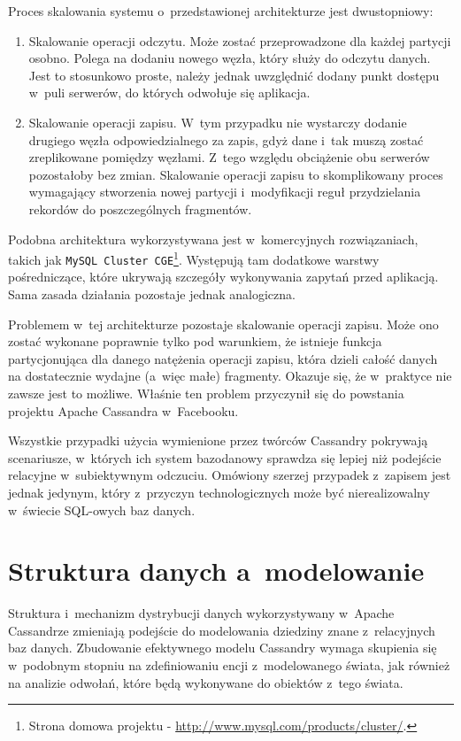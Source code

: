 Proces skalowania systemu o~przedstawionej architekturze jest dwustopniowy:

\begin{enumerate}
	\item Skalowanie operacji odczytu. Może zostać przeprowadzone dla każdej partycji osobno. Polega na dodaniu nowego węzła, który służy do odczytu danych. Jest to stosunkowo proste, należy jednak uwzględnić dodany punkt dostępu w~puli serwerów, do których odwołuje się aplikacja.
	\item Skalowanie operacji zapisu. W~tym przypadku nie wystarczy dodanie drugiego węzła odpowiedzialnego za zapis, gdyż dane i~tak muszą zostać zreplikowane pomiędzy węzłami. Z~tego względu obciążenie obu serwerów pozostałoby bez zmian. Skalowanie operacji zapisu to skomplikowany proces wymagający stworzenia nowej partycji i~modyfikacji reguł przydzielania rekordów do poszczególnych fragmentów. 
\end{enumerate}

Podobna architektura wykorzystywana jest w~komercyjnych rozwiązaniach, takich jak \verb+MySQL Cluster CGE+\footnote{Strona domowa projektu - \url{http://www.mysql.com/products/cluster/}.}. Występują tam dodatkowe warstwy pośredniczące, które ukrywają szczegóły wykonywania zapytań przed aplikacją. Sama zasada działania pozostaje jednak analogiczna.

Problemem w~tej architekturze pozostaje skalowanie operacji zapisu. Może ono zostać wykonane poprawnie tylko pod warunkiem, że istnieje funkcja partycjonująca dla danego natężenia operacji zapisu, która dzieli całość danych na dostatecznie wydajne (a~więc małe) fragmenty. Okazuje się, że w~praktyce nie zawsze jest to możliwe. Właśnie ten problem przyczynił się do powstania projektu Apache Cassandra w~Facebooku. 

Wszystkie przypadki użycia wymienione przez twórców Cassandry pokrywają scenariusze, w~których ich system bazodanowy sprawdza się lepiej niż podejście relacyjne w~subiektywnym odczuciu. Omówiony szerzej przypadek z~zapisem jest jednak jedynym, który z~przyczyn technologicznych może być nierealizowalny w~świecie SQL-owych baz danych.

\section{Struktura danych a~modelowanie}
\label{sec:relative_vs_cassandra_model}

Struktura i~mechanizm dystrybucji danych wykorzystywany w~Apache Cassandrze zmieniają podejście do modelowania dziedziny znane z~relacyjnych baz danych. Zbudowanie efektywnego modelu Cassandry wymaga skupienia się w~podobnym stopniu na zdefiniowaniu encji z~modelowanego świata, jak również na analizie odwołań, które będą wykonywane do obiektów z~tego świata.~\cite{modeling_best_practices_pt_1}

